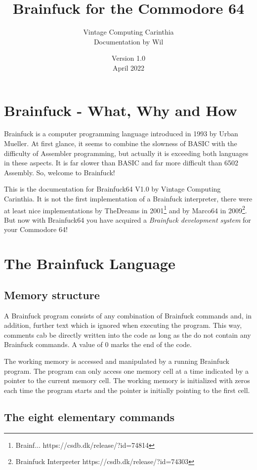 \documentclass[ms,article,a4paper]{memoir}
\title{Brainfuck for the Commodore 64}
\author{Vintage Computing Carinthia\\Documentation by Wil}
\date{Version 1.0\\April 2022}
\begin{document}
\maketitle
\vfill
\tableofcontents*
\thispagestyle{empty}

\newpage
\section{Brainfuck - What, Why and How}

Brainfuck is a computer programming language introduced in 1993 by Urban Mueller. At first glance, it seems to combine the slowness of BASIC with the difficulty of Assembler programming, but actually it is exceeding both languages in these aspects. It is far slower than BASIC and far more difficult than 6502 Assembly. So, welcome to Brainfuck!

This is the documentation for Brainfuck64 V1.0 by Vintage Computing Carinthia. It is not the first implementation of a Brainfuck interpreter, there were at least nice implementations by TheDreams in 2001\footnote{Brainf... https://csdb.dk/release/?id=74814} and by Marco64 in 2009\footnote{Brainfuck Interpreter https://csdb.dk/release/?id=74303}. But now with Brainfuck64 you have acquired a \emph{Brainfuck development system} for your Commodore 64!

\section{The Brainfuck Language}

\subsection{Memory structure}

A Brainfuck program consists of any combination of Brainfuck commands and, in addition, further text which is ignored when executing the program. This way, comments cab be directly written into the code as long as the do not contain any Brainfuck commands. A value of 0 marks the end of the code. 

The working memory is accessed and manipulated by a running Brainfuck program. The program can only access one memory cell at a time indicated by a pointer to the current memory cell. The working memory is initialized with zeros each time the program starts and the pointer is initially pointing to the first cell.

\subsection{The eight elementary commands}
\end{document}
